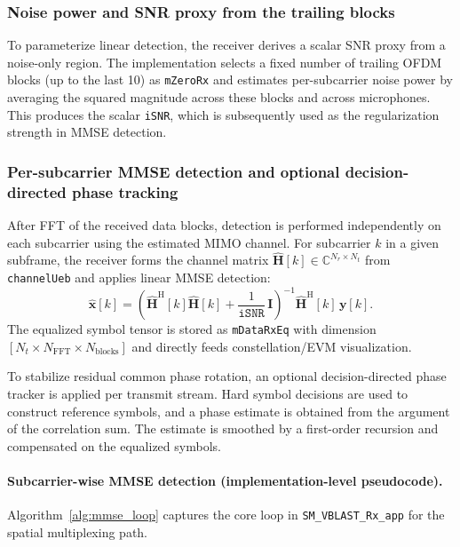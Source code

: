 \subsubsection{Noise power and SNR proxy from the trailing blocks}
\label{sec:snr_proxy_clean}

To parameterize linear detection, the receiver derives a scalar SNR proxy from a noise-only region. The implementation selects a fixed number of trailing OFDM blocks (up to the last 10) as \texttt{mZeroRx} and estimates per-subcarrier noise power by averaging the squared magnitude across these blocks and across microphones. This produces the scalar \texttt{iSNR}, which is subsequently used as the regularization strength in MMSE detection.

\subsubsection{Per-subcarrier MMSE detection and optional decision-directed phase tracking}
\label{sec:mmse_detect_clean}

After FFT of the received data blocks, detection is performed independently on each subcarrier using the estimated MIMO channel. For subcarrier $k$ in a given subframe, the receiver forms the channel matrix $\hat{\mathbf{H}}[k]\in\mathbb{C}^{N_r\times N_t}$ from \texttt{channelUeb} and applies linear MMSE detection:
\begin{equation}
\hat{\mathbf{x}}[k] =
\left(\hat{\mathbf{H}}^{\mathrm{H}}[k]\hat{\mathbf{H}}[k] + \frac{1}{\texttt{iSNR}}\,\mathbf{I}\right)^{-1}
\hat{\mathbf{H}}^{\mathrm{H}}[k]\,\mathbf{y}[k].
\label{eq:mmse_clean}
\end{equation}
The equalized symbol tensor is stored as \texttt{mDataRxEq} with dimension $[N_t \times N_{\mathrm{FFT}} \times N_{\mathrm{blocks}}]$ and directly feeds constellation/EVM visualization.

To stabilize residual common phase rotation, an optional decision-directed phase tracker is applied per transmit stream. Hard symbol decisions are used to construct reference symbols, and a phase estimate is obtained from the argument of the correlation sum. The estimate is smoothed by a first-order recursion and compensated on the equalized symbols.

\paragraph{Subcarrier-wise MMSE detection (implementation-level pseudocode).}
Algorithm~\ref{alg:mmse_loop} captures the core loop in \texttt{SM\_VBLAST\_Rx\_app} for the spatial multiplexing path.

